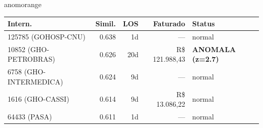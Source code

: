 \documentclass[a4paper,10pt]{article}
\begin{document}
\begin{anomalycard}[Internacao 165987 | GHO-PETROBRAS | ALTO (z=3.84)]{anomorange}
\begin{tabular}{l r r r l}\toprule\textbf{Intern.} & \textbf{Simil.} & \textbf{LOS} & \textbf{Faturado} & \textbf{Status} \\\midrule
125785 (GOHOSP-CNU) & 0.638 & 1d & --- & \textcolor{jcubeblue}{normal} \\
10852 (GHO-PETROBRAS) & 0.626 & 20d & R\$ 121.988,43 & \textcolor{anomred}{\textbf{ANOMALA (z=2.7)}} \\
6758 (GHO-INTERMEDICA) & 0.624 & 9d & --- & \textcolor{jcubeblue}{normal} \\
1616 (GHO-CASSI) & 0.614 & 9d & R\$ 13.086,22 & \textcolor{jcubeblue}{normal} \\
64433 (PASA) & 0.611 & 1d & --- & \textcolor{jcubeblue}{normal} \\
\bottomrule\end{tabular}


\end{anomalycard}

\newpage
\end{document}
